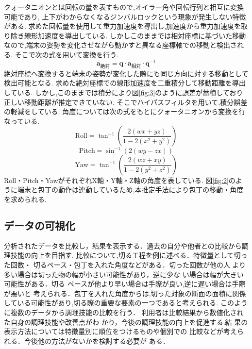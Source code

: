 クォータニオンとは回転の量を表すもので,オイラー角や回転行列と相互に変換可能であり,
上下がわからなくなるジンバルロックという現象が発生しない特徴がある.
求めた回転量を使用して重力加速度を導出し,加速度から重力加速度を取り除き線形加速度を導出している.
しかしこのままでは相対座標に基づいた移動なので,端末の姿勢を変化させながら動かすと異なる座標軸での移動と検出される.
そこで次の式を用いて変換を行う.
\[
\mathbf{a}_{\text{絶対}} = \mathbf{q} \cdot \mathbf{a}_{\text{相対}} \cdot \mathbf{q}^{-1}
\]
絶対座標へ変換すると端末の姿勢が変化した際にも同じ方向に対する移動として検出可能となる.
求めた絶対座標での線形加速度を二重積分して移動距離を導出している.
しかし,このままでは積分により図\ref{fig:3}のように誤差が蓄積しており正しい移動距離が推定できていない.
そこでハイパスフィルタを用いて,積分誤差の軽減をしている.
角度については次の式をもとにクォータニオンから変換を行なっている.
    \[
	\text{Roll} = \tan^{-1}\left( \frac{2(w x + y z)}{1 - 2(x^2 + y^2)} \right)
	\]
	\[
	\text{Pitch} = \sin^{-1}\left( 2(w y - z x) \right)
	\]
	\[
	\text{Yaw} = \tan^{-1}\left( \frac{2(w z + x y)}{1 - 2(y^2 + z^2)} \right)
	\]
Roll・Pitch・YawがそれぞれX軸・Y軸・Z軸の角度を表している.
図\ref{fig:2}のように端末と包丁の動作は連動しているため,本推定手法により包丁の移動・角度を求められる.

\subsection{データの可視化}
分析されたデータを比較し，結果を表示する．過去の自分や他者との比較から調理技能の向上を目指す.
比較について,切る工程を例に述べる．特徴量として切った回数・
切るペース・包丁を入れた角度などがある．切った回数が他の人
より多い場合は切った物の幅が小さい可能性があり，逆に少な
い場合は幅が大きい可能性がある．切る
ペースが他より早い場合は手際が良い,逆に遅い場合は手際が悪いと
考えられる．包丁を入れた角度からは,切った対象の断面の面積に関係している可能性があり,切る際の重要な要素の一つであると考えられる.
このように複数のデータから調理技能の比較を行う．
利用者は比較結果から数値化された自身の調理技能や改善点がわ
かり，今後の調理技能の向上を促進する.結
果の表示方法については特徴量別に順位をつけるものや個別での
比較などが考えられる．今後他の方法がないかを検討する必要が
ある．
